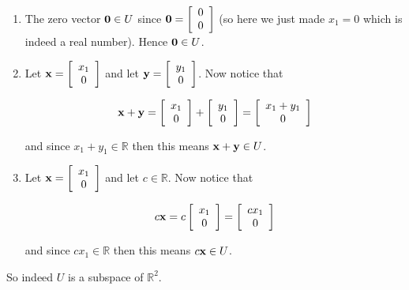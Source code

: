 \documentclass[12pt]{article}
\begin{document}
\begin{enumerate}
\item The zero vector ${\bf 0} \in U$ since ${\bf 0} = \left[ \begin{array}{c} 0  \\ 0  \end{array} \right]$ (so here we just made $x_1 = 0$ which is indeed a real number).  Hence ${\bf 0}\in U$.

\item Let ${\bf x}=\left[ \begin{array}{c} x_1  \\ 0  \end{array} \right]$ and let ${\bf y}=\left[ \begin{array}{c} y_1  \\ 0  \end{array} \right]$.  Now notice that

\[ {\bf x} + {\bf y} = \left[ \begin{array}{c} x_1  \\ 0  \end{array} \right] + \left[ \begin{array}{c} y_1  \\ 0  \end{array} \right] = \left[ \begin{array}{c} x_1 + y_1  \\ 0  \end{array} \right] \]

and since $x_1+y_1 \in \mathbb{R}$ then this means ${\bf x} + {\bf y}\in U$.

\item Let ${\bf x}=\left[ \begin{array}{c} x_1  \\ 0  \end{array} \right]$ and let $c\in \mathbb{R}$.  Now notice that 

\[ c{\bf x} = c \left[ \begin{array}{c} x_1  \\ 0  \end{array} \right] = \left[ \begin{array}{c} cx_1  \\ 0  \end{array} \right] \]

and since $cx_1\in \mathbb{R}$ then this means $c{\bf x}\in U$.
\end{enumerate}

So indeed $U$ is a subspace of $\mathbb{R}^2$.
\end{document}
